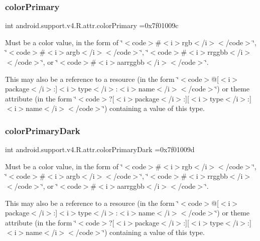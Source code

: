 \subsubsection{\texorpdfstring{color\+Primary}{colorPrimary}}
{\footnotesize\ttfamily int android.\+support.\+v4.\+R.\+attr.\+color\+Primary =0x7f01009c\hspace{0.3cm}{\ttfamily [static]}}

Must be a color value, in the form of \char`\"{}$<$code$>$\#$<$i$>$rgb$<$/i$>$$<$/code$>$\char`\"{}, \char`\"{}$<$code$>$\#$<$i$>$argb$<$/i$>$$<$/code$>$\char`\"{}, \char`\"{}$<$code$>$\#$<$i$>$rrggbb$<$/i$>$$<$/code$>$\char`\"{}, or \char`\"{}$<$code$>$\#$<$i$>$aarrggbb$<$/i$>$$<$/code$>$\char`\"{}. 

This may also be a reference to a resource (in the form \char`\"{}$<$code$>$@\mbox{[}$<$i$>$package$<$/i$>$\+:\mbox{]}$<$i$>$type$<$/i$>$\+:$<$i$>$name$<$/i$>$$<$/code$>$\char`\"{}) or theme attribute (in the form \char`\"{}$<$code$>$?\mbox{[}$<$i$>$package$<$/i$>$\+:\mbox{]}\mbox{[}$<$i$>$type$<$/i$>$\+:\mbox{]}$<$i$>$name$<$/i$>$$<$/code$>$\char`\"{}) containing a value of this type. \mbox{\label{classandroid_1_1support_1_1v4_1_1R_1_1attr_a6fc63ddfec27d2e1ddf500bd17b1d8b5}} 
\subsubsection{\texorpdfstring{color\+Primary\+Dark}{colorPrimaryDark}}
{\footnotesize\ttfamily int android.\+support.\+v4.\+R.\+attr.\+color\+Primary\+Dark =0x7f01009d\hspace{0.3cm}{\ttfamily [static]}}

Must be a color value, in the form of \char`\"{}$<$code$>$\#$<$i$>$rgb$<$/i$>$$<$/code$>$\char`\"{}, \char`\"{}$<$code$>$\#$<$i$>$argb$<$/i$>$$<$/code$>$\char`\"{}, \char`\"{}$<$code$>$\#$<$i$>$rrggbb$<$/i$>$$<$/code$>$\char`\"{}, or \char`\"{}$<$code$>$\#$<$i$>$aarrggbb$<$/i$>$$<$/code$>$\char`\"{}. 

This may also be a reference to a resource (in the form \char`\"{}$<$code$>$@\mbox{[}$<$i$>$package$<$/i$>$\+:\mbox{]}$<$i$>$type$<$/i$>$\+:$<$i$>$name$<$/i$>$$<$/code$>$\char`\"{}) or theme attribute (in the form \char`\"{}$<$code$>$?\mbox{[}$<$i$>$package$<$/i$>$\+:\mbox{]}\mbox{[}$<$i$>$type$<$/i$>$\+:\mbox{]}$<$i$>$name$<$/i$>$$<$/code$>$\char`\"{}) containing a value of this type. \mbox{\label{classandroid_1_1support_1_1v4_1_1R_1_1attr_a6028fce7673c59e3b4d6dec1bc997df8}} 
